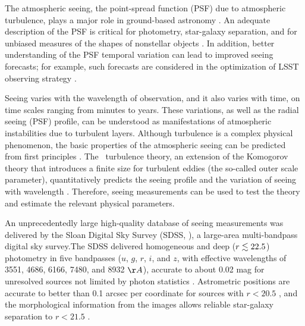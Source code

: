 

The atmospheric seeing, the point-spread function (PSF) due to atmospheric turbulence, plays
a major role in ground-based astronomy \citep{Roddier1981}. An adequate description 
of the PSF is critical for photometry, star-galaxy separation, and for unbiased measures of 
the shapes of nonstellar objects \citep{Lupton2001}. In addition, better understanding of the 
PSF temporal variation can lead to improved seeing forecasts; for example, such forecasts are 
considered in the optimization of LSST observing strategy \citep{LSSToverview}.

Seeing varies with the wavelength of observation, and it also varies with time, on time 
scales ranging from minutes to years. These variations, as well as the radial seeing (PSF) 
profile, can be understood as manifestations of atmospheric instabilities due to turbulent layers. 
Although turbulence is a complex physical phenomenon, the basic properties of the atmospheric
seeing can be predicted from first principles \citep{Racine2009}. The
\vk~turbulence theory, 
an extension of the Komogorov theory that introduces a finite size for turbulent eddies (the so-called
outer scale parameter), quantitatively predicts the seeing profile and the variation of seeing
with wavelength \citep{vk1, vk2}. Therefore, seeing measurements can be used to test the theory and estimate
the relevant physical parameters. 

An unprecedentedly large high-quality database of seeing measurements was delivered by the Sloan Digital Sky Survey (SDSS, \citealt{York2000}), a large-area multi-bandpass digital sky survey.The SDSS delivered homogeneous and deep 
($r\lesssim22.5$) photometry in five bandpasses ($u$, $g$, $r$, $i$, and $z$, with effective wavelengths 
of 3551, 4686, 6166, 7480, and 8932 $\AA$), accurate to about 0.02 mag for unresolved sources 
not limited by photon statistics \citep{Sesar2007}. Astrometric positions are accurate to better 
than 0.1 arcsec per coordinate for sources with $r<20.5$ \citep{Pier2003}, and the morphological 
information from the images allows reliable star-galaxy separation to $r<21.5$ \citep{Lupton2002}.
 
